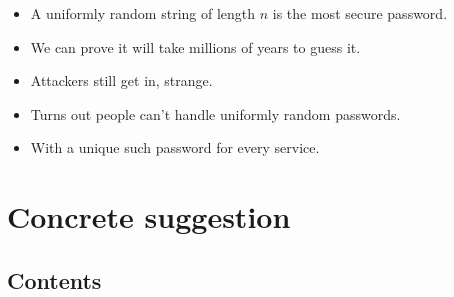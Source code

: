 \begin{frame}
  \begin{example}
    \begin{itemize}
      \item A uniformly random string of length \(n\) is the most secure 
        password.

      \item We can prove it will take millions of years to guess it.
    \end{itemize}
  \end{example}

  \pause

  \begin{remark}
    \begin{itemize}
      \item Attackers still get in, strange.
    \end{itemize}
  \end{remark}
\end{frame}

\begin{frame}
  \begin{example}[Usability]
    \begin{itemize}
      \item Turns out people can't handle uniformly random passwords.
      \item With a unique such password for every service.
    \end{itemize}
  \end{example}
\end{frame}



\section{Concrete suggestion}

\subsection{Contents}

